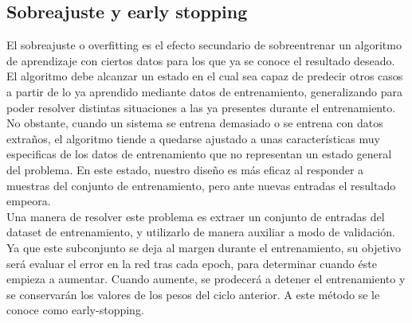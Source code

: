 \subsection{Sobreajuste y early stopping}
El sobreajuste o overfitting es el efecto secundario de sobreentrenar un algoritmo de aprendizaje con ciertos datos para los que ya se conoce el resultado deseado. El algoritmo debe alcanzar un estado en el cual sea capaz de predecir otros casos a partir de lo ya aprendido mediante datos de entrenamiento, generalizando para poder resolver distintas situaciones a las ya presentes durante el entrenamiento. No obstante, cuando un sistema se entrena demasiado o se entrena con datos extraños, el algoritmo tiende a quedarse ajustado a unas características muy especificas de los datos de entrenamiento que no representan un estado general del problema. En este estado, nuestro diseño es más eficaz al responder a muestras del conjunto de entrenamiento, pero ante nuevas entradas el resultado empeora.\\
Una manera de resolver este problema es extraer un conjunto de entradas del dataset de entrenamiento, y utilizarlo de manera auxiliar a modo de validación. Ya que este subconjunto se deja al margen durante el entrenamiento, su objetivo será evaluar el error en la red tras cada epoch, para determinar cuando éste empieza a aumentar. Cuando aumente, se prodecerá a detener el entrenamiento y se conservarán los valores de los pesos del ciclo anterior. A este método se le conoce como early-stopping.


